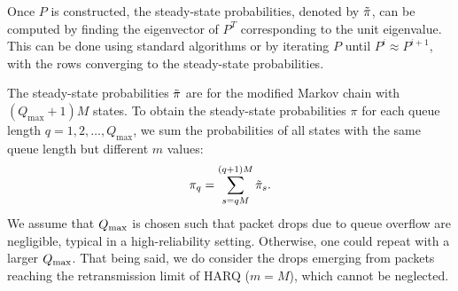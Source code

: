 Once $P$ is constructed, the steady-state probabilities, denoted by $\Tilde{\pi}$, can be computed by finding the eigenvector of $P^T$ corresponding to the unit eigenvalue. This can be done using standard algorithms or by iterating $P$ until $P^i \approx P^{i+1}$, with the rows converging to the steady-state probabilities.

The steady-state probabilities $\Tilde{\pi}$ are for the modified Markov chain with $(Q_{\mathrm{max}}+1)M$ states. To obtain the steady-state probabilities ${\pi}$ for each queue length $q=1,2,\dots, Q_{\mathrm{max}}$, we sum the probabilities of all states with the same queue length but different $m$ values:
\begin{equation}
    \pi_q = \sum_{s=qM}^{(q+1)M}\Tilde{\pi}_s.
\end{equation}
We assume that $Q_{\mathrm{max}}$ is chosen such that packet drops due to queue overflow are negligible, typical in a high-reliability setting. Otherwise, one could repeat with a larger $Q_{\mathrm{max}}$. That being said, we do consider the drops emerging from packets reaching the retransmission limit of HARQ ($m=M$), which cannot be neglected.

